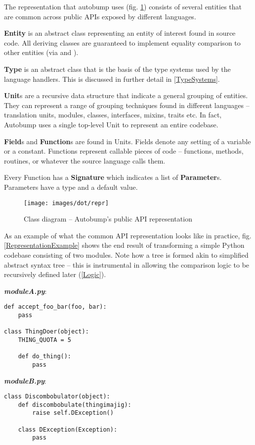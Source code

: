 \documentclass{l4proj}
\begin{document}
The representation that autobump uses (fig. \ref{RepresentationUML})
consists of several entities that are common across public APIs
exposed by different languages.

\textbf{Entity} is an abstract class representing an entity of
interest found in source code. All deriving classes are guaranteed to
implement equality comparison to other entities (via
\texttt{} and \texttt{}).

\textbf{Type} is an abstract class that is the basis of the type
systems used by the language handlers. This is discussed in further
detail in \ref{TypeSystems}.

\textbf{Unit}s are a recursive data structure that indicate a
general grouping of entities. They can represent a range of grouping
techniques found in different languages -- translation units, modules,
classes, interfaces, mixins, traits etc. In fact, Autobump uses a
single top-level Unit to represent an entire codebase.

\textbf{Field}s and \textbf{Function}s are found in Units. Fields
denote any setting of a variable or a constant. Functions represent
callable pieces of code -- functions, methods, routines, or whatever
the source language calls them.

Every Function has a \textbf{Signature} which indicates a list of
\textbf{Parameter}s. Parameters have a type and a default value.

\begin{figure}
\centering
\texttt{[image: images/dot/repr]}
\caption{Class diagram -- Autobump's public API representation}
\label{RepresentationUML}
\end{figure}


\clearpage
As an example of what the common API representation looks like in
practice, fig. \ref{RepresentationExample} shows the end result of
transforming a simple Python codebase consisting of two modules. Note
how a tree is formed akin to simplified abstract syntax tree -- this is
instrumental in allowing the comparison logic to be recursively
defined later (\ref{Logic}).

\begin{minipage}[t]{0.5\textwidth}
\noindent\textbf{\textit{moduleA.py}}:\\
\begin{lstlisting}
def accept_foo_bar(foo, bar):
    pass

class ThingDoer(object):
    THING_QUOTA = 5

    def do_thing():
        pass
\end{lstlisting}
\end{minipage}
\begin{minipage}[t]{0.5\textwidth}
\noindent\textbf{\textit{moduleB.py}}:\\
\begin{lstlisting}
class Discombobulator(object):
    def discombobulate(thingimajig):
        raise self.DException()

    class DException(Exception):
        pass
\end{lstlisting}
\end{minipage}
\end{document}
